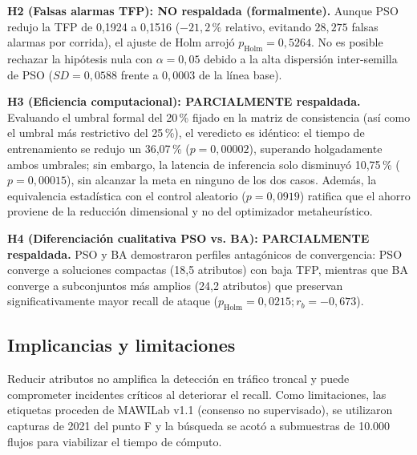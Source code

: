 \documentclass[11pt,a4paper]{article}
\begin{document}
\textbf{H2 (Falsas alarmas TFP): NO respaldada (formalmente).} Aunque PSO redujo la TFP de 0,1924 a 0,1516 ($-21{,}2\,\%$ relativo, evitando $28{,}275$ falsas alarmas por corrida), el ajuste de Holm arrojó $p_{\text{Holm}} = 0{,}5264$. No es posible rechazar la hipótesis nula con $\alpha = 0{,}05$ debido a la alta dispersión inter-semilla de PSO ($SD = 0{,}0588$ frente a $0{,}0003$ de la línea base).

\textbf{H3 (Eficiencia computacional): PARCIALMENTE respaldada.} Evaluando el umbral formal del 20\,\% fijado en la matriz de consistencia (así como el umbral más restrictivo del 25\,\%), el veredicto es idéntico: el tiempo de entrenamiento se redujo un 36,07\,\% ($p = 0{,}00002$), superando holgadamente ambos umbrales; sin embargo, la latencia de inferencia solo disminuyó 10,75\,\% ($p = 0{,}00015$), sin alcanzar la meta en ninguno de los dos casos. Además, la equivalencia estadística con el control aleatorio ($p = 0{,}0919$) ratifica que el ahorro proviene de la reducción dimensional y no del optimizador metaheurístico.

\textbf{H4 (Diferenciación cualitativa PSO vs. BA): PARCIALMENTE respaldada.} PSO y BA demostraron perfiles antagónicos de convergencia: PSO converge a soluciones compactas (18,5 atributos) con baja TFP, mientras que BA converge a subconjuntos más amplios (24,2 atributos) que preservan significativamente mayor recall de ataque ($p_{\text{Holm}} = 0{,}0215; r_b = -0{,}673$).

\subsection{Implicancias y limitaciones}
Reducir atributos no amplifica la detección en tráfico troncal y puede comprometer incidentes críticos al deteriorar el recall. Como limitaciones, las etiquetas proceden de MAWILab v1.1 (consenso no supervisado), se utilizaron capturas de 2021 del punto F y la búsqueda se acotó a submuestras de 10.000 flujos para viabilizar el tiempo de cómputo.

\end{document}

